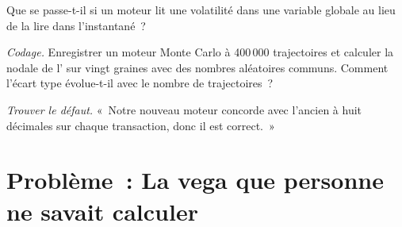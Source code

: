 \begin{exercise}[$\star\star$]\label{exo:dv:build-a-pricing-library:6}
Que se passe-t-il si un moteur lit une volatilité dans une variable globale au lieu de la lire dans l'instantané~?
\end{exercise}

\begin{exercise}[$\star\star\star$]\label{exo:dv:build-a-pricing-library:7}
\emph{Codage.} Enregistrer un moteur Monte Carlo à 400\,000 trajectoires et calculer la  nodale de l' sur vingt graines avec des nombres aléatoires communs. Comment
l'écart type évolue-t-il avec le nombre de trajectoires~?
\end{exercise}

\begin{exercise}[$\star\star\star$]\label{exo:dv:build-a-pricing-library:8}
\emph{Trouver le défaut.} «~Notre nouveau moteur concorde avec l'ancien à huit décimales sur chaque transaction, donc il est correct.~»
\end{exercise}

\section{Problème~: La vega que personne ne savait calculer}

